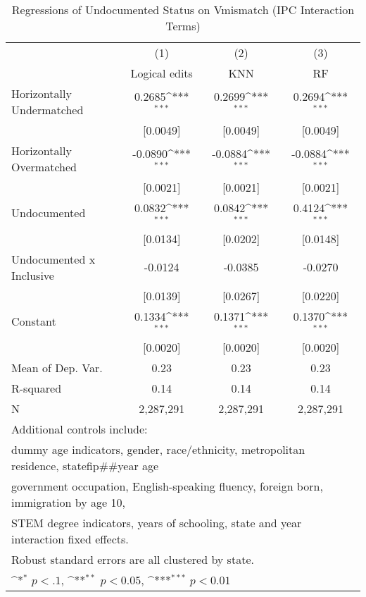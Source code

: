 \begin{table}[htbp]\centering
\def\sym#1{\ifmmode^{#1}\else\(^{#1}\)\fi}
\caption{Regressions of Undocumented Status on Vmismatch (IPC Interaction Terms)}
\begin{tabular}{l*{3}{c}}
\toprule
                    &\multicolumn{1}{c}{(1)}         &\multicolumn{1}{c}{(2)}         &\multicolumn{1}{c}{(3)}         \\
                    &Logical edits         &         KNN         &          RF         \\
\midrule
Horizontally Undermatched&      0.2685\sym{***}&      0.2699\sym{***}&      0.2694\sym{***}\\
                    &    [0.0049]         &    [0.0049]         &    [0.0049]         \\
\addlinespace
Horizontally Overmatched&     -0.0890\sym{***}&     -0.0884\sym{***}&     -0.0884\sym{***}\\
                    &    [0.0021]         &    [0.0021]         &    [0.0021]         \\
\addlinespace
Undocumented        &      0.0832\sym{***}&      0.0842\sym{***}&      0.4124\sym{***}\\
                    &    [0.0134]         &    [0.0202]         &    [0.0148]         \\
\addlinespace
Undocumented x Inclusive&     -0.0124         &     -0.0385         &     -0.0270         \\
                    &    [0.0139]         &    [0.0267]         &    [0.0220]         \\
\addlinespace
Constant            &      0.1334\sym{***}&      0.1371\sym{***}&      0.1370\sym{***}\\
                    &    [0.0020]         &    [0.0020]         &    [0.0020]         \\
\midrule
Mean of Dep. Var.   &        0.23         &        0.23         &        0.23         \\
R-squared           &        0.14         &        0.14         &        0.14         \\
N                   &   2,287,291         &   2,287,291         &   2,287,291         \\
\bottomrule
\multicolumn{4}{l}{\footnotesize Additional controls include:}\\
\multicolumn{4}{l}{\footnotesize dummy age indicators, gender, race/ethnicity, metropolitan residence, statefip##year age}\\
\multicolumn{4}{l}{\footnotesize government occupation, English-speaking fluency, foreign born, immigration by age 10,}\\
\multicolumn{4}{l}{\footnotesize STEM degree indicators, years of schooling, state and year interaction fixed effects.}\\
\multicolumn{4}{l}{\footnotesize Robust standard errors are all clustered by state.}\\
\multicolumn{4}{l}{\footnotesize \sym{*} \(p<.1\), \sym{**} \(p<0.05\), \sym{***} \(p<0.01\)}\\
\end{tabular}
\end{table}
